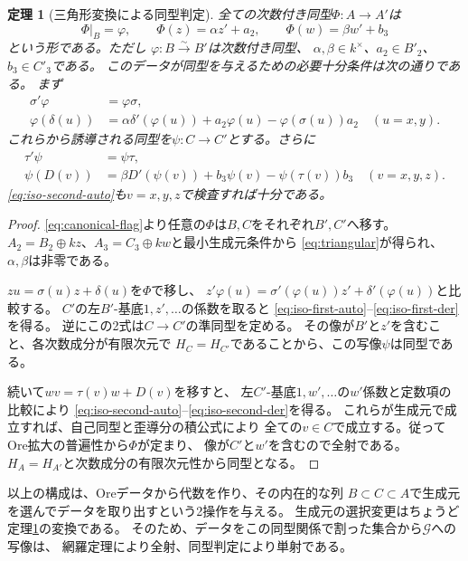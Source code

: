 \documentclass[11pt,a4paper]{ltjsarticle}
\newtheorem{theorem}{定理}[section]
\theoremstyle{definition}
\newcommand{\Gclass}{\mathcal G}
\begin{document}
\begin{theorem}[三角形変換による同型判定]\label{thm:graded-isomorphisms}
全ての次数付き同型$\Phi:A\to A'$は
\begin{equation}\label{eq:triangular}
\Phi|_B=\varphi,\qquad
\Phi(z)=\alpha z'+a_2,\qquad
\Phi(w)=\beta w'+b_3
\end{equation}
という形である。ただし
$\varphi:B\xrightarrow{\sim}B'$は次数付き同型、
$\alpha,\beta\in k^\times$、$a_2\in B'_2$、$b_3\in C'_3$である。
このデータが同型を与えるための必要十分条件は次の通りである。
まず
\begin{align}
\sigma'\varphi&=\varphi\sigma,\label{eq:iso-first-auto}\\
\varphi(\delta(u))
&=\alpha\delta'(\varphi(u))+a_2\varphi(u)
-\varphi(\sigma(u))a_2\quad(u=x,y).\label{eq:iso-first-der}
\end{align}
これらから誘導される同型を$\psi:C\to C'$とする。さらに
\begin{align}
\tau'\psi&=\psi\tau,\label{eq:iso-second-auto}\\
\psi(D(v))
&=\beta D'(\psi(v))+b_3\psi(v)-\psi(\tau(v))b_3
\quad(v=x,y,z).\label{eq:iso-second-der}
\end{align}
\eqref{eq:iso-second-auto}も$v=x,y,z$で検査すれば十分である。
\end{theorem}
\begin{proof}
\eqref{eq:canonical-flag}より任意の$\Phi$は$B,C$をそれぞれ$B',C'$へ移す。
$A_2=B_2\oplus kz$、$A_3=C_3\oplus kw$と最小生成元条件から
\eqref{eq:triangular}が得られ、$\alpha,\beta$は非零である。

$zu=\sigma(u)z+\delta(u)$を$\Phi$で移し、
$z'\varphi(u)=\sigma'(\varphi(u))z'+\delta'(\varphi(u))$と比較する。
$C'$の左$B'$-基底$1,z',\ldots$の係数を取ると
\eqref{eq:iso-first-auto}--\eqref{eq:iso-first-der}を得る。
逆にこの2式は$C\to C'$の準同型を定める。
その像が$B'$と$z'$を含むこと、各次数成分が有限次元で
$H_C=H_{C'}$であることから、この写像$\psi$は同型である。

続いて$wv=\tau(v)w+D(v)$を移すと、
左$C'$-基底$1,w',\ldots$の$w'$係数と定数項の比較により
\eqref{eq:iso-second-auto}--\eqref{eq:iso-second-der}を得る。
これらが生成元で成立すれば、自己同型と歪導分の積公式により
全ての$v\in C$で成立する。従ってOre拡大の普遍性から$\Phi$が定まり、
像が$C'$と$w'$を含むので全射である。
$H_A=H_{A'}$と次数成分の有限次元性から同型となる。
\end{proof}

以上の構成は、Oreデータから代数を作り、その内在的な列
$B\subset C\subset A$で生成元を選んでデータを取り出すという2操作を与える。
生成元の選択変更はちょうど定理\ref{thm:graded-isomorphisms}の変換である。
そのため、データをこの同型関係で割った集合から$\Gclass$への写像は、
網羅定理により全射、同型判定により単射である。
\end{document}
